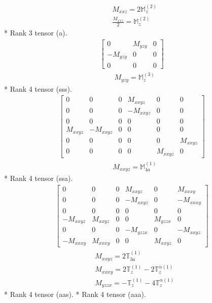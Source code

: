 \documentclass[fleqn,8pt,landscape]{jsarticle}
\begin{document}
\begin{align*}
& M_{xxz} = 2 \mathbb{M}_{z}^{(2)} \\
& \frac{M_{xxz}}{2} = \mathbb{M}_{z}^{(2)}
\end{align*}
* Rank 3 tensor (a).
\begin{align*}
\begin{bmatrix} 0 & M_{yzy} & 0 \\ - M_{yzy} & 0 & 0 \\ 0 & 0 & 0 \end{bmatrix}
\end{align*}
\begin{align*}
& M_{yzy} = \mathbb{M}_{z}^{(3)}
\end{align*}
* Rank 4 tensor (sss).
\begin{align*}
\begin{bmatrix} 0 & 0 & 0 & M_{xxyz} & 0 & 0 \\ 0 & 0 & 0 & - M_{xxyz} & 0 & 0 \\ 0 & 0 & 0 & 0 & 0 & 0 \\ M_{xxyz} & - M_{xxyz} & 0 & 0 & 0 & 0 \\ 0 & 0 & 0 & 0 & 0 & M_{xxyz} \\ 0 & 0 & 0 & 0 & M_{xxyz} & 0 \end{bmatrix}
\end{align*}
\begin{align*}
& M_{xxyz} = \mathbb{M}_{4a}^{(1)}
\end{align*}
* Rank 4 tensor (ssa).
\begin{align*}
\begin{bmatrix} 0 & 0 & 0 & M_{xxyz} & 0 & M_{xxxy} \\ 0 & 0 & 0 & - M_{xxyz} & 0 & - M_{xxxy} \\ 0 & 0 & 0 & 0 & 0 & 0 \\ - M_{xxyz} & M_{xxyz} & 0 & 0 & M_{yzzx} & 0 \\ 0 & 0 & 0 & - M_{yzzx} & 0 & - M_{xxyz} \\ - M_{xxxy} & M_{xxxy} & 0 & 0 & M_{xxyz} & 0 \end{bmatrix}
\end{align*}
\begin{align*}
& M_{xxyz} = 2 \mathbb{T}_{3a}^{(1)} \\
& M_{xxxy} = 2 \mathbb{T}_{z}^{(1)} - 2 \mathbb{T}_{z}^{\alpha(1)} \\
& M_{yzzx} = - \mathbb{T}_{z}^{(1)} - 4 \mathbb{T}_{z}^{\alpha(1)}
\end{align*}
* Rank 4 tensor (aas).
* Rank 4 tensor (aaa).
\end{document}

